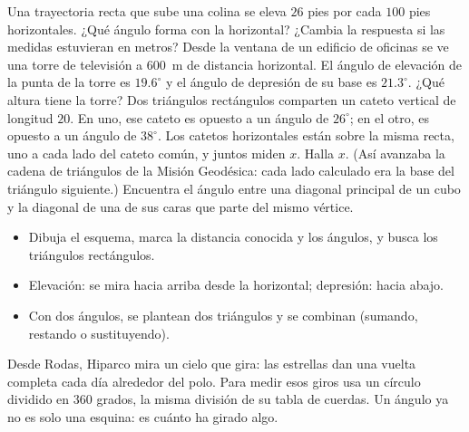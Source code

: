 \documentclass[11pt]{article}
\begin{document}
\begin{preguntas}
\pregunta Una trayectoria recta que sube una colina se eleva $26$ pies por cada
$100$ pies horizontales. ¿Qué ángulo forma con la horizontal? ¿Cambia la
respuesta si las medidas estuvieran en metros?
\espacio{2.5cm}
\pregunta Desde la ventana de un edificio de oficinas se ve una torre de televisión
a $600$~m de distancia horizontal. El ángulo de elevación de la punta de la torre
es $\num{19,6}^\circ$ y el ángulo de depresión de su base es $\num{21,3}^\circ$. ¿Qué
altura tiene la torre?
\espacio{3cm}
\pregunta Dos triángulos rectángulos comparten un cateto vertical de longitud $20$.
En uno, ese cateto es opuesto a un ángulo de $26^\circ$; en el otro, es opuesto a
un ángulo de $38^\circ$. Los catetos horizontales están sobre la misma recta, uno a
cada lado del cateto común, y juntos miden $x$. Halla $x$. (Así avanzaba la
cadena de triángulos de la Misión Geodésica: cada lado calculado era la base
del triángulo siguiente.)
\espacio{3cm}
\pregunta Encuentra el ángulo entre una diagonal principal de un cubo y la diagonal
de una de sus caras que parte del mismo vértice.
\espacio{3cm}
\end{preguntas}

\begin{resumen}
\begin{itemize}
  \item Dibuja el esquema, marca la distancia conocida y los ángulos, y busca los triángulos rectángulos.
  \item Elevación: se mira hacia arriba desde la horizontal; depresión: hacia abajo.
  \item Con dos ángulos, se plantean dos triángulos y se combinan (sumando, restando o sustituyendo).
\end{itemize}
\end{resumen}

\label{tema:rotacion}

\begin{hilo}
Desde Rodas, Hiparco mira un cielo que gira: las estrellas dan una vuelta
completa cada día alrededor del polo. Para medir esos giros usa un círculo
dividido en $360$ grados, la misma división de su tabla de cuerdas. Un ángulo
ya no es solo una esquina: es cuánto ha girado algo.
\end{hilo}
\end{document}
